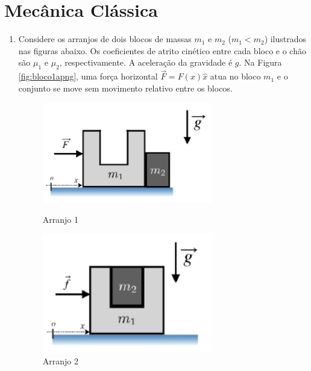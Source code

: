%
%
\chapter{Mecânica Clássica}

\begin{enumerate}[start=1,label={\bfseries Q\arabic*.}]


\item Considere os arranjos de dois blocos de massas $m_{1}$ e $m_{2}$ ($m_{1} < m_{2}$) ilustrados nas figuras abaixo. Os coeficientes de atrito cinético entre cada bloco e o chão são $\mu_{1}$ e $\mu_{2}$, respectivamente. A aceleração da gravidade é $g$. Na Figura \ref{fig:bloco1apng}, uma força horizontal $\vec{F} = F(x)\hat{x}$ atua no bloco $m_{1}$ e o conjunto se move sem movimento relativo entre os blocos.


\begin{figure}[!ht]
	\centering
	\begin{minipage}{0.5\textwidth}
		\centering
		\includegraphics[width=0.7\textwidth]{classica-img/bloco1a.png} 
		\caption{Arranjo 1}
		\label{fig:bloco1apng}
	\end{minipage}\hfill
	\begin{minipage}{0.5\textwidth}
		\centering
		\includegraphics[width=0.7\textwidth]{classica-img/bloco2a.png}
		\caption{Arranjo 2}
		\label{fig:bloco2apng}
	\end{minipage}
\end{figure}


\end{enumerate}
